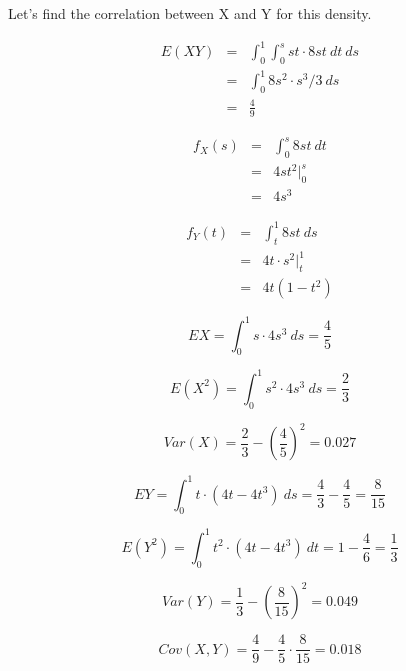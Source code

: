 Let's find the correlation between X and Y for this density. 

\begin{eqnarray}
E(XY) &=& 
\int_{0}^{1} \int_{0}^{s} st \cdot 8st ~ dt ~ ds \\
&=& \int_{0}^{1} 8s^2 \cdot s^3/3 ~ ds \\
&=& \frac{4}{9}
\end{eqnarray}

\begin{eqnarray}
f_X(s) &=& \int_{0}^{s} 8st ~ dt \\ 
&=& 4s t^2 \Big |_0^s \\
&=& 4s^3 
\end{eqnarray}

\begin{eqnarray}
f_Y(t) &=& \int_{t}^{1} 8st ~ ds \\ 
&=& 4t \cdot s^2 \Big |_t^1 \\
&=& 4t (1-t^2)
\end{eqnarray}

\begin{equation}
EX = \int_{0}^{1} s \cdot 4s^3 ~ ds  = \frac{4}{5}
\end{equation}

\begin{equation}
E(X^2) = \int_{0}^{1} s^2 \cdot 4s^3 ~ ds  = \frac{2}{3}
\end{equation}

\begin{equation}
Var(X) =  \frac{2}{3} - \left (\frac{4}{5} \right )^2 = 0.027
\end{equation}

\begin{equation}
EY = \int_{0}^{1} t \cdot (4t-4t^3)  ~ ds  
= \frac{4}{3} - \frac{4}{5}
= \frac{8}{15}
\end{equation}

\begin{equation}
E(Y^2) = \int_{0}^{1} t^2 \cdot (4t-4t^3) ~ dt  = 
1 - \frac{4}{6} = \frac{1}{3}
\end{equation}

\begin{equation}
Var(Y) =  \frac{1}{3} - \left (\frac{8}{15} \right )^2 = 0.049
\end{equation}

\begin{equation}
Cov(X,Y) = \frac{4}{9} - \frac{4}{5} \cdot \frac{8}{15} = 0.018
\end{equation}

